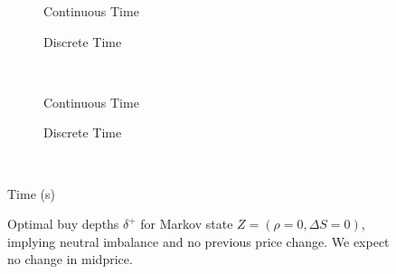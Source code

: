 \begin{figure}
\centering
\begin{subfigure}{.45\linewidth}
  \centering
  \setlength\figureheight{\linewidth} 
  \setlength\figurewidth{\linewidth}
  
  \caption{Continuous Time}
\end{subfigure}%
\hfill%
\begin{subfigure}{.45\linewidth}
  \centering
  \setlength\figureheight{\linewidth} 
  \setlength\figurewidth{\linewidth}
   
  \caption{Discrete Time}
\end{subfigure}\\
\vspace{1cm}
\begin{subfigure}{.45\linewidth}
  \centering
  \setlength\figureheight{\linewidth} 
  \setlength\figurewidth{\linewidth}
  
  \caption{Continuous Time}
\end{subfigure}%
\hfill%
\begin{subfigure}{.45\linewidth}
  \centering
  \setlength\figureheight{\linewidth} 
  \setlength\figurewidth{\linewidth}
   
  \caption{Discrete Time}
\end{subfigure}\\

\leavevmode{}\hspace{0pt plus 1filll}\null

Time (s)

\vspace{1cm}
\begin{subfigure}{\linewidth}
  \centering
   
\end{subfigure}%
  \caption{Optimal buy depths $\delta^+$ for Markov state $Z=(\rho = 0, \Delta S = 0)$, implying neutral imbalance and no previous price change. We expect no change in midprice.}
  \label{fig:comp_dp_z8_test}
\end{figure}

